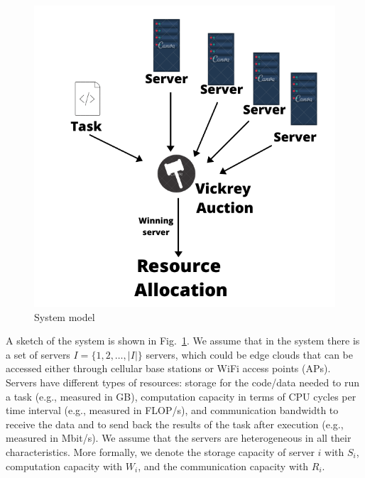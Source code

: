 \documentclass[sotoncolour]{extra/uosproject}     %
\begin{document}
\begin{figure}
    \centering
    \includegraphics{extra/system_model.pdf}
    \caption{System model}
    \label{fig:system_model}
\end{figure}

A sketch of the system is shown in Fig.~\ref{fig:system_model}. 
We assume that in the system there is a set of servers $I = \{1,2,\ldots,\left|I\right|\}$ servers, which could be edge clouds that can be accessed either through cellular base stations or WiFi access points (APs). Servers have different types of resources: storage for the code/data needed to run a task (e.g., measured in GB), computation capacity in terms of CPU cycles per time interval (e.g., measured in FLOP/s), and communication bandwidth to receive the data and to send back the results of the task after execution (e.g., measured in Mbit/s). We assume that the servers are heterogeneous in all their characteristics. More formally, we denote the storage capacity of server $i$ with $S_i$, computation capacity with $W_i$, and the communication capacity with $R_i$.
\end{document}
